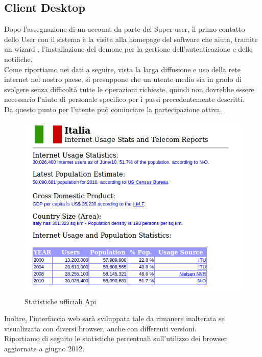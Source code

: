 \subsection{Client Desktop}
Dopo l’assegnazione di un account da parte del Super-user, il primo contatto dello User con il sistema è la visita alla homepage del software che aiuta, tramite un wizard , l’installazione del demone per la gestione dell’autenticazione e delle notifiche.\\
Come riportiamo nei dati a seguire, vista la larga diffusione e uso della rete internet nel nostro paese, si presuppone che un utente medio sia in grado di svolgere senza difficoltà tutte le operazioni richieste, quindi non dovrebbe essere necessario l’aiuto di personale specifico per i passi precedentemente descritti.\\
Da questo punto per l’utente può cominciare la partecipazione attiva.\\


\begin{figure}[H]
\centering
\caption{Statistiche ufficiali Api}
\includegraphics[scale=0.55]{images/cap1/statItaly} 
\end{figure}

Inoltre, l'interfaccia web sarà sviluppata tale da rimanere inalterata se visualizzata con diversi browser, anche con differenti versioni.\\
Riportiamo di seguito le statistiche percentuali sull'utilizzo dei browser aggiornate a giugno 2012.

